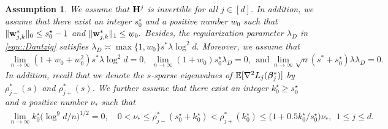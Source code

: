 \documentclass[twoside,11pt]{article}
\newtheorem{assumption}[theorem]{Assumption}
\newcommand{\defeq}{\vcentcolon=}
\newcommand*{\bbetas}{\bbeta^*}
\newcommand*{\hessstarss}{\nabla^2 {L_j}(\bbeta^*_{j})}
\newcommand*{\sw}{\wb^*}
\newcommand*{\limn}{\lim \limits_{n\rightarrow \infty} }
\begin{document}



\begin{assumption} \label{assume::Dantzig}
We assume that   $\mathbf{H}^j$ is invertible for  all $j \in [d]$.  In addition, we assume that there exist an integer $s_0^\star$ and a positive number $w_0$ such that  $\| \sw_{j,k}   \|_0 \leq  s_0^\star - 1$ and $ \| \sw _{j,k}  \|_1 \leq w_0.$    Besides, the regularization parameter $\lambda_D$ in  \eqref{equ::Dantzig} satisfies $\lambda_D \asymp \max\{1,w_0\}  s^* \lambda \log^2 d.$ Moreover, we assume that 
\begin{align}\label{equ::assumptionDantzig}
\limn (1 \!+\! w_0 \!+\! w_0^2 ) s^* \lambda \log^2 d  = 0,~~\limn (1\!+\! w_0) s_0^\star \lambda_D = 0,~~\text{and}~\limn \sqrt{n}(s^* \!\!+\! s_0^\star ) \lambda \lambda_D = 0.
\end{align}
In addition, recall that we denote the $s$-sparse eigenvalues of $\EE  [ \hessstarss ]$ by  $\rho_{j-}^*(s)$ and $\rho_{j+}^*(s)$. We further assume that there exist an integer $k_0^\star \geq  s_0^\star$ and  a positive number $\nu_*$ such that 
 \begin{align*} 
\limn k_0^\star \bigl(\log^ 9 d /n\bigr)^{1/2}  = 0,  \quad  0< \nu_{*} \leq \rho_{j-}^*( s_0^\star + k_0^\star) < \rho_{j+}^*( k_0^\star )   \leq \bigl (1 +  0.5k_0^\star /s_0^\star \bigr ) \nu_*,~~1\leq j\leq d.
\end{align*}


\end{assumption}
\end{document}
